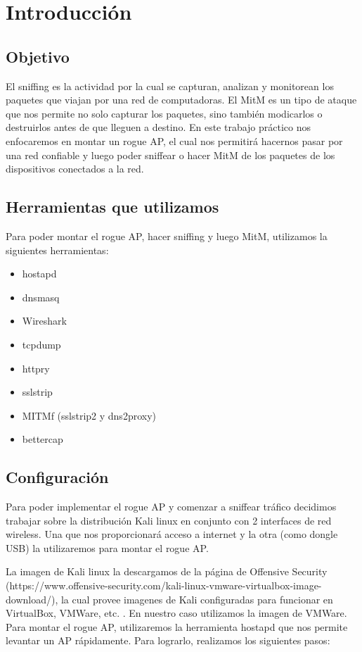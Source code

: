 \section{Introducción}

\subsection{Objetivo}
El sniffing es la actividad por la cual se capturan, analizan y monitorean los paquetes que viajan por una red de computadoras. El MitM es un tipo de ataque
que nos permite no solo capturar los paquetes, sino también modicarlos o destruirlos antes de que lleguen a destino. En este trabajo práctico nos enfocaremos 
en montar un rogue AP, el cual nos permitirá hacernos pasar por una red confiable y luego poder sniffear o hacer MitM de los paquetes de los dispositivos 
conectados a la red.

\subsection{Herramientas que utilizamos}

Para poder montar el rogue AP, hacer sniffing y luego MitM, utilizamos la siguientes herramientas:

\begin{itemize}
	\item hostapd
	\item dnsmasq
	\item Wireshark
	\item tcpdump
	\item httpry
	\item sslstrip
	\item MITMf (sslstrip2 y dns2proxy)
	\item bettercap
\end{itemize}

\subsection{Configuración}
Para poder implementar el rogue AP y comenzar a sniffear tráfico decidimos trabajar sobre la distribución Kali linux en conjunto con 2 interfaces de red wireless. 
Una que nos proporcionará acceso a internet y la otra (como dongle USB) la utilizaremos para montar el rogue AP. 

La imagen de Kali linux la descargamos de la página de Offensive Security (https://www.offensive-security.com/kali-linux-vmware-virtualbox-image-download/), 
la cual provee imagenes de Kali configuradas para funcionar en VirtualBox, VMWare, etc. . En nuestro caso utilizamos la imagen de VMWare. Para montar el rogue AP, 
utilizaremos la herramienta hostapd que nos permite levantar un AP rápidamente. Para lograrlo, realizamos los siguientes pasos:

